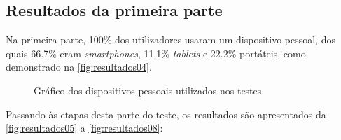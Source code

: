 \documentclass[11pt,twoside,a4paper]{report}
\begin{document}
\subsection{Resultados da primeira parte}
Na primeira parte, 100\% dos utilizadores usaram um dispositivo pessoal, dos quais 66.7\% eram \textit{smartphones}, 11.1\% \textit{tablets} e 22.2\% portáteis, como demonstrado na \autoref{fig:resultados04}.
\begin{figure}[H]
	\centering
	\hspace{-0.5cm}
	\caption{Gráfico dos dispositivos pessoais utilizados nos testes}
	\label{fig:resultados04}
\end{figure}
\newpage
Passando às etapas desta parte do teste, os resultados são apresentados da \autoref{fig:resultados05} a \autoref{fig:resultados08}:
\end{document}
